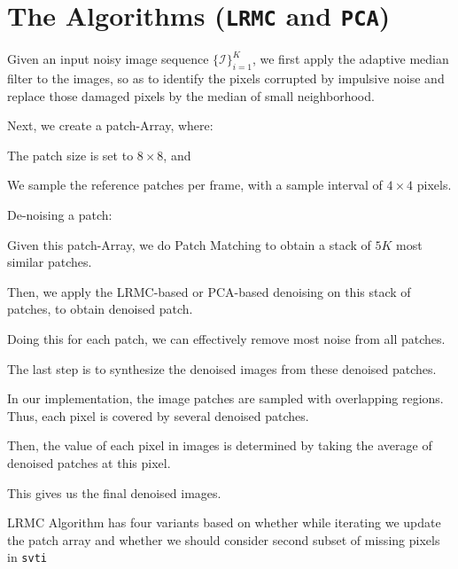 \documentclass[fleqn, 11pt]{article}
\begin{document}
\newpage

\section*{The Algorithms (\texttt{LRMC} and \texttt{PCA})}

Given an input noisy image sequence $\{\mathcal{I}\}_{i=1}^{K}$, 
we first apply
the adaptive median filter to the images, so as to 
identify the pixels corrupted by impulsive
noise and replace those damaged pixels by the median of 
small neighborhood.

\medskip

Next, we create 
a patch-Array, where:

The patch size is set to $8 \times 8$, and 

We sample the reference patches per frame, with a sample interval of 
$4 \times 4$ pixels. 

\bigskip 

De-noising a patch:

\smallskip

Given this patch-Array, we do Patch Matching to obtain a stack of $5K$ 
most similar patches. 

Then, we apply the LRMC-based or PCA-based denoising on
this stack of patches, to obtain denoised patch.

\medskip

Doing this for each patch, 
we can effectively remove most noise from all patches. 

\bigskip

The last step is to synthesize the denoised images from these denoised patches.

\medskip

In our implementation, the image patches are sampled with
overlapping regions. Thus, each pixel is covered by several
denoised patches. 

\medskip

Then, the value of each pixel in images
is determined by taking the average of denoised patches at
this pixel. 

\medskip

This gives us the final denoised images.

\bigskip
\bigskip

LRMC Algorithm has four variants based on whether while iterating we update the patch array and whether we should consider second subset of missing pixels in \texttt{svti}

\medskip
\end{document}
